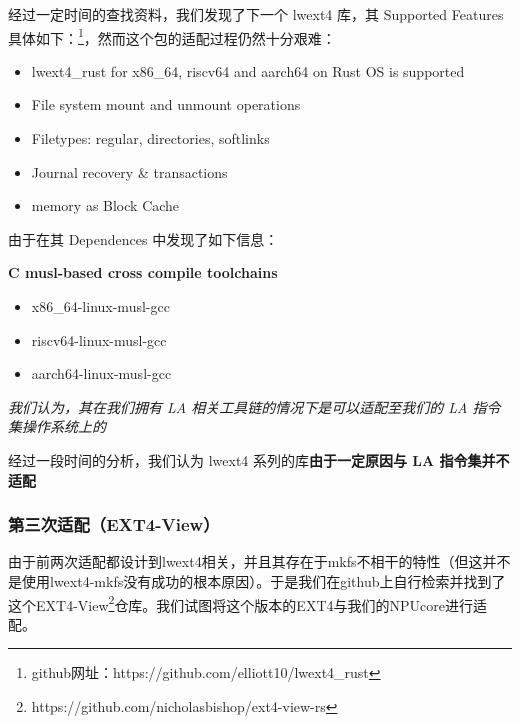 经过一定时间的查找资料，我们发现了下一个 lwext4 库，其 Supported Features 具体如下：\footnote{github网址：https://github.com/elliott10/lwext4_rust}，然而这个包的适配过程仍然十分艰难：

\begin{itemize}
    \item lwext4_rust for x86_64, riscv64 and aarch64 on Rust OS is supported
    \item File system mount and unmount operations
    \item Filetypes: regular, directories, softlinks
    \item Journal recovery \& transactions
    \item memory as Block Cache
\end{itemize}

由于在其 Dependences 中发现了如下信息：

\begin{center}
    \textbf{C musl-based cross compile toolchains}
    \begin{itemize}
        \centering
        \item x86_64-linux-musl-gcc
        \item riscv64-linux-musl-gcc
        \item aarch64-linux-musl-gcc
    \end{itemize}
\end{center}

\textit{我们认为，其在我们拥有 LA 相关工具链的情况下是可以适配至我们的 LA 指令集操作系统上的}

经过一段时间的分析，我们认为 lwext4 系列的库\textbf{由于一定原因与 LA 指令集并不适配}

\subsubsection{第三次适配（EXT4-View）}

由于前两次适配都设计到lwext4相关，并且其存在于mkfs不相干的特性（但这并不是使用lwext4-mkfs没有成功的根本原因）。于是我们在github上自行检索并找到了这个EXT4-View\footnote{https://github.com/nicholasbishop/ext4-view-rs}仓库。我们试图将这个版本的EXT4与我们的NPUcore进行适配。

